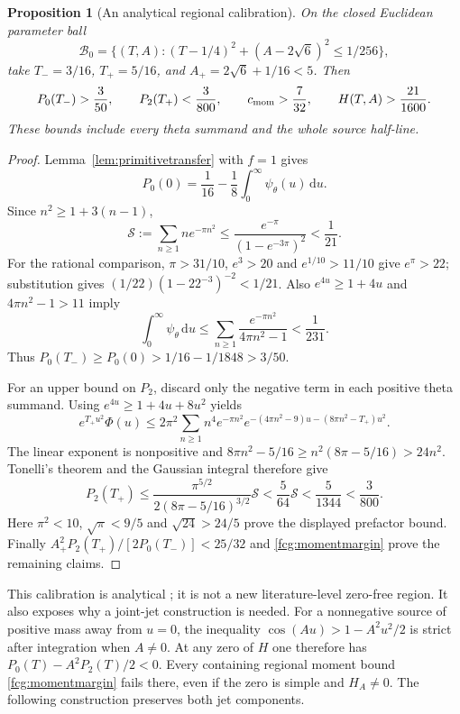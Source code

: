 \documentclass[11pt]{article}
\numberwithin{equation}{section}
\newtheorem{proposition}[theorem]{Proposition}
\newcommand{\dd}{\,\mathrm d}
\begin{document}
\begin{proposition}[An analytical regional calibration]
\label{fcg:momentcalibration}
On the closed Euclidean parameter ball
\[
 \mathcal B_0=\{(T,A):(T-1/4)^2+(A-2\sqrt6)^2\le1/256\},
\]
take $T_-=3/16$, $T_+=5/16$, and $A_+=2\sqrt6+1/16<5$.
Then
\begin{equation}\label{fcg:momentconstants}
 P_0(T_-)>\frac3{50},\qquad P_2(T_+)<\frac3{800},\qquad
 c_{\rm mom}>\frac7{32},\qquad H(T,A)>\frac{21}{1600}.
\end{equation}
These bounds include every theta summand and the whole source half-line.
\end{proposition}
\begin{proof}
Lemma~\ref{lem:primitivetransfer} with $f=1$ gives
\[
 P_0(0)=\frac1{16}-\frac18\int_0^\infty\psi_\theta(u)\dd u.
\]
Since $n^2\ge1+3(n-1)$,
\[
 \mathcal S:=\sum_{n\ge1}n e^{-\pi n^2}
 \le\frac{e^{-\pi}}{(1-e^{-3\pi})^2}<\frac1{21}.
\]
For the rational comparison, $\pi>31/10$, $e^3>20$ and
$e^{1/10}>11/10$ give $e^\pi>22$; substitution gives
$(1/22)(1-22^{-3})^{-2}<1/21$. Also $e^{4u}\ge1+4u$ and
$4\pi n^2-1>11$ imply
\[
 \int_0^\infty\psi_\theta\dd u
 \le\sum_{n\ge1}\frac{e^{-\pi n^2}}{4\pi n^2-1}
 <\frac1{231}.
\]
Thus $P_0(T_-)\ge P_0(0)>1/16-1/1848>3/50$.

For an upper bound on $P_2$, discard only the negative term in each
positive theta summand. Using $e^{4u}\ge1+4u+8u^2$ yields
\[
 e^{T_+u^2}\Phi(u)
 \le2\pi^2\sum_{n\ge1}n^4 e^{-\pi n^2}
 e^{-(4\pi n^2-9)u-(8\pi n^2-T_+)u^2}.
\]
The linear exponent is nonpositive and
$8\pi n^2-5/16\ge n^2(8\pi-5/16)>24n^2$.
Tonelli's theorem and the Gaussian integral therefore give
\[
 P_2(T_+)
 \le\frac{\pi^{5/2}}{2(8\pi-5/16)^{3/2}}\mathcal S
 <\frac5{64}\mathcal S<\frac5{1344}<\frac3{800}.
\]
Here $\pi^2<10$, $\sqrt\pi<9/5$ and $\sqrt{24}>24/5$
prove the displayed prefactor bound. Finally
$A_+^2P_2(T_+)/[2P_0(T_-)]<25/32$ and
\eqref{fcg:momentmargin} prove the remaining claims.
\end{proof}

This calibration is analytical \cite{FCGMoment}; it is not a new
literature-level zero-free region. It also exposes why a joint-jet
construction is needed. For a nonnegative source of positive mass away
from $u=0$, the inequality $\cos(Au)>1-A^2u^2/2$ is strict after
integration when $A\ne0$. At any zero of $H$ one therefore has
$P_0(T)-A^2P_2(T)/2<0$. Every containing regional moment bound
\eqref{fcg:momentmargin} fails there, even if the zero is simple and
$H_A\ne0$. The following construction preserves both jet components.
\end{document}
